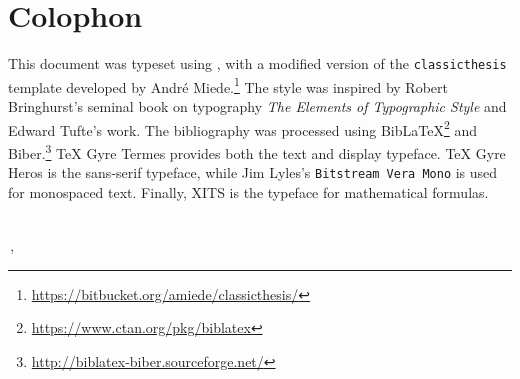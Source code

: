 \pagestyle{empty}

\hfill

\vfill


\section*{Colophon}
This document was typeset using \LuaLaTeX, with a modified version of
the \texttt{classicthesis} template developed by André
Miede.\footnote{\url{https://bitbucket.org/amiede/classicthesis/}}
The style was inspired by Robert Bringhurst's seminal book on typography
\emph{The Elements of Typographic Style}\autocite{Bringhurst2004-wn}
and Edward Tufte's work.\autocite{Tufte1983-pr, Tufte1994-wf,
Tufte1997-fx, Tufte2006-ui}
The bibliography was processed using
Bib\LaTeX\footnote{\url{https://www.ctan.org/pkg/biblatex}} and
Biber.\footnote{\url{http://biblatex-biber.sourceforge.net/}}
TeX Gyre Termes provides both the text and display typeface.
\textsf{TeX Gyre Heros} is the sans-serif typeface, while Jim Lyles's
\texttt{Bitstream Vera Mono} is used for monospaced text.
Finally, XITS is the typeface for mathematical formulas.

\bigskip
{\small
\noindent\textit{\myTitle}
\\
\noindent\textcopyright\,\finalVersion, \myName
}
